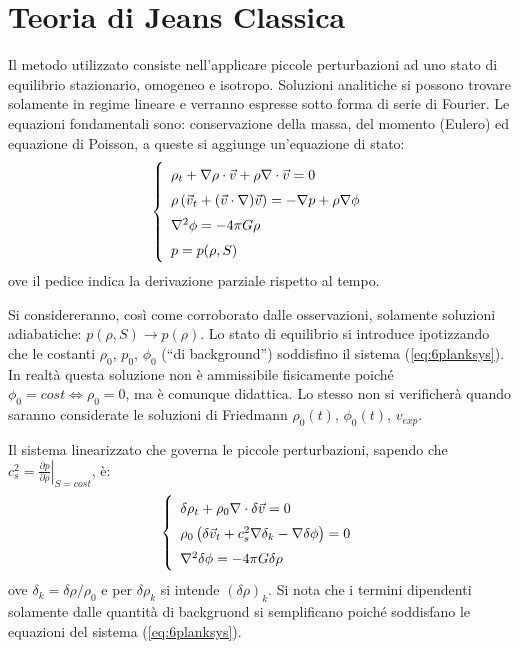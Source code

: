 \section{Teoria di Jeans Classica}
Il metodo utilizzato consiste nell'applicare piccole perturbazioni ad uno stato di equilibrio stazionario, omogeneo e isotropo. Soluzioni analitiche si possono trovare solamente in regime lineare e verranno espresse sotto forma di serie di Fourier. Le equazioni fondamentali sono: conservazione della massa, del momento (Eulero) ed equazione di Poisson, a queste si aggiunge un'equazione di stato:
\begin{equation}\left\{
    \def\arraystretch{1.5}
        \begin{array}{l}
        \rho_t + \nabla \rho \cdot \vec{v} + \rho \nabla \cdot \vec{v} =0\\
        \rho \left (  \vec{v}_t + (\vec{v}\cdot \nabla )\vec{v}\right)=-\nabla p + \rho \nabla \phi \\
        \nabla^2 \phi = -4\pi G \rho \\
        p=p(\rho, S) 
    \end{array}\right. \label{eq:6planksys}
\end{equation}
ove il pedice indica la derivazione parziale rispetto al tempo. 

Si considereranno, così come corroborato dalle osservazioni, solamente soluzioni adiabatiche: $p(\rho, S)\rightarrow p(\rho)$. Lo stato di equilibrio si introduce ipotizzando che le costanti $\rho_0$, $p_0$, $\phi_0$ (``di background'') soddisfino il sistema (\ref{eq:6planksys}). In realtà questa soluzione non è ammissibile fisicamente poiché $\phi_0 = cost \Leftrightarrow \rho_0=0 $, ma è comunque didattica. Lo stesso non si verificherà quando saranno considerate le soluzioni di Friedmann $\rho_0(t)$, $\phi_0(t)$, $v_{exp}$.

Il sistema linearizzato che governa le piccole perturbazioni, sapendo che $c_s^2 = \left . \frac{\partial p}{\partial \rho} \right |_{S=cost}$, è:
\begin{equation}\left\{
    \def\arraystretch{1.5}
        \begin{array}{l}
        \delta\rho_t + \rho_0\nabla\cdot \delta \vec{v} =0 \\
        \rho_0 \left ( \delta \vec{v}_t + c_s^2 \nabla \delta_k - \nabla \delta\phi \right) = 0 \\
        \nabla^2 \delta \phi = -4\pi G \delta\rho
    \end{array}\right. 
\end{equation}
ove $\delta_k=\delta \rho / \rho_0$ e per $\delta \rho_k$ si intende $(\delta\rho)_k$. Si nota che i termini dipendenti solamente dalle quantità di backgruond si semplificano poiché soddisfano le equazioni del sistema (\ref{eq:6planksys}).

